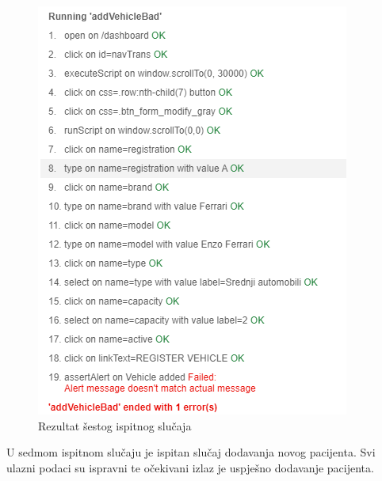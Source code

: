 			\begin{figure}[H]
				\centering
				\includegraphics[width=\textwidth]{"slike/Selenium/transport testovi/addVehicleBad_rezultat.png"}
				\caption{Rezultat šestog ispitnog slučaja}
				\label{fig: addVehicleBad_rezultat}
			\end{figure}
			\eject
			U sedmom ispitnom slučaju je ispitan slučaj dodavanja novog pacijenta. Svi ulazni podaci su ispravni te očekivani izlaz je uspješno dodavanje pacijenta.
